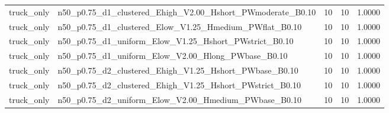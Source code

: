 \begin{tabular}{llrrr}
truck_only & n50_p0.75_d1_clustered_Ehigh_V2.00_Hshort_PWmoderate_B0.10 & 10 & 10 & 1.0000 \\
truck_only & n50_p0.75_d1_clustered_Elow_V1.25_Hmedium_PWflat_B0.10 & 10 & 10 & 1.0000 \\
truck_only & n50_p0.75_d1_uniform_Elow_V1.25_Hshort_PWstrict_B0.10 & 10 & 10 & 1.0000 \\
truck_only & n50_p0.75_d1_uniform_Elow_V2.00_Hlong_PWbase_B0.10 & 10 & 10 & 1.0000 \\
truck_only & n50_p0.75_d2_clustered_Ehigh_V1.25_Hshort_PWbase_B0.10 & 10 & 10 & 1.0000 \\
truck_only & n50_p0.75_d2_clustered_Ehigh_V1.25_Hshort_PWstrict_B0.10 & 10 & 10 & 1.0000 \\
truck_only & n50_p0.75_d2_uniform_Elow_V2.00_Hmedium_PWbase_B0.10 & 10 & 10 & 1.0000 \\
\bottomrule
\end{tabular}

